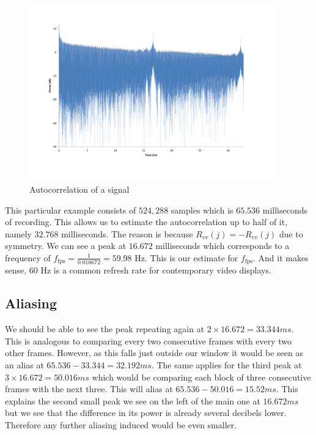 \documentclass[a4paper,12pt,twoside,openright]{report}
\begin{document}
\begin{figure}[h]
\centering
  \includegraphics[width=0.96\textwidth]{autocorr}
  \caption{Autocorrelation of a signal}
  \label{fig:autocorr}
\end{figure}

This particular example consists of $524,288$ samples which is $65.536$ milliseconds of recording. This allows us to estimate the autocorrelation up to half of it, namely $32.768$ milliseconds. The reason is because $R_{vv}(j)=-R_{vv}(j)$ due to symmetry. We can see a peak at $16.672$ milliseconds which corresponds to a frequency of $f_\text{fps} = \frac{1}{0.016672} = 59.98$ Hz. This is our estimate for $f_\text{fps}$. And it makes sense, $60$ Hz is a common refresh rate for contemporary video displays.

\subsection{Aliasing}
We should be able to see the peak repeating again at $2 \times 16.672 = 33.344 ms$. This is analogous to comparing every two consecutive frames with every two other frames. However, as this falls just outside our window it would be seen as an alias at $65.536-33.344 = 32.192 ms$. The same applies for the third peak at $3 \times 16.672 = 50.016 ms$ which would be comparing each block of three consecutive frames with the next three. This will alias at $65.536 - 50.016 = 15.52 ms$. This explains the second small peak we see on the left of the main one at $16.672 ms$ but we see that the difference in its power is already several decibels lower. Therefore any further aliasing induced would be even smaller.
\end{document}
